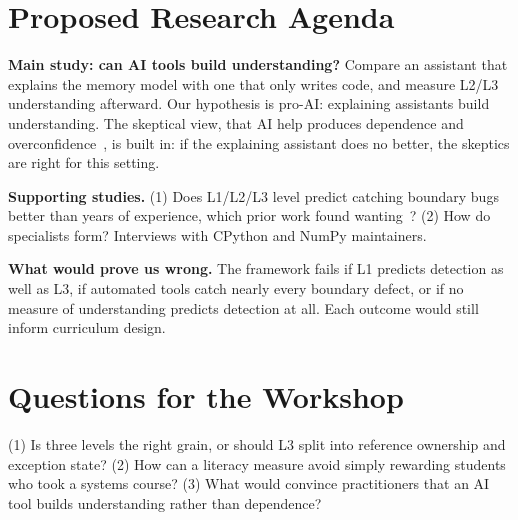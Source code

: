 \documentclass[conference]{IEEEtran}
\begin{document}
\section{Proposed Research Agenda}

\textbf{Main study: can AI tools build understanding?} Compare an assistant that explains the memory model with one that only writes code, and measure L2/L3 understanding afterward. Our hypothesis is pro-AI: explaining assistants build understanding. The skeptical view, that AI help produces dependence and overconfidence~\cite{prather2024,lee2025}, is built in: if the explaining assistant does no better, the skeptics are right for this setting.

\textbf{Supporting studies.} (1) Does L1/L2/L3 level predict catching boundary bugs better than years of experience, which prior work found wanting~\cite{khalid2027}? (2) How do specialists form? Interviews with CPython and NumPy maintainers.

\textbf{What would prove us wrong.} The framework fails if L1 predicts detection as well as L3, if automated tools catch nearly every boundary defect, or if no measure of understanding predicts detection at all. Each outcome would still inform curriculum design.

\section{Questions for the Workshop}

(1) Is three levels the right grain, or should L3 split into reference ownership and exception state? (2) How can a literacy measure avoid simply rewarding students who took a systems course? (3) What would convince practitioners that an AI tool builds understanding rather than dependence?



\end{document}
